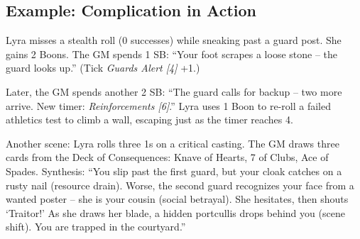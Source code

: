 \subsection{Example: Complication in Action}

Lyra misses a stealth roll (0 successes) while sneaking past a guard post. She gains 2 Boons. The GM spends 1 SB: ``Your foot scrapes a loose stone – the guard looks up.'' (Tick \textit{Guards Alert [4]} +1.)

Later, the GM spends another 2 SB: ``The guard calls for backup – two more arrive. New timer: \textit{Reinforcements [6]}.'' Lyra uses 1 Boon to re-roll a failed athletics test to climb a wall, escaping just as the timer reaches 4.

Another scene: Lyra rolls three 1s on a critical casting. The GM draws three cards from the Deck of Consequences: Knave of Hearts, 7 of Clubs, Ace of Spades. Synthesis: ``You slip past the first guard, but your cloak catches on a rusty nail (resource drain). Worse, the second guard recognizes your face from a wanted poster – she is your cousin (social betrayal). She hesitates, then shouts `Traitor!' As she draws her blade, a hidden portcullis drops behind you (scene shift). You are trapped in the courtyard.''

